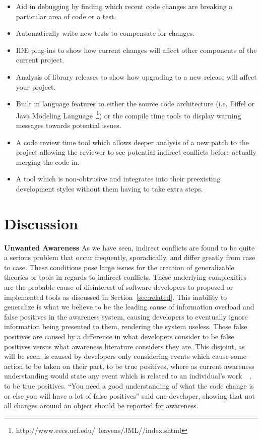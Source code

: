 \documentclass[conference]{IEEEtran}
\begin{document}
\begin{itemize}
	\item Aid in debugging by finding which recent code changes are breaking a particular area of code or a test.
	\item Automatically write new tests to compensate for changes.
	\item IDE plug-ins to show how current changes will affect other components of the current project.
	\item Analysis of library releases to show how upgrading to a new release will affect your project.
	\item Built in language features to either the source code architecture (i.e. Eiffel or 
				Java Modeling Language~\footnote{http://www.eecs.ucf.edu/~leavens/JML//index.shtml}) or the compile 
				time tools to display warning messages towards potential issues.
	\item A code review time tool which allows deeper analysis of a new patch to the project allowing the reviewer to see potential 
				indirect conflicts before actually merging the code in.
	\item A tool which is non-obtrusive and integrates into their preexisting development styles without them having to take extra steps.
\end{itemize}

\section{Discussion}
\label{sec:disc}

\textbf{Unwanted Awareness} As we have seen, indirect conflicts are found to be quite a serious problem that occur frequently,
sporadically, and differ greatly from case to case. These conditions pose large issues for the creation of generalizable theories
or tools in regards to indirect conflicts. These underlying complexities are the probable cause of disinterest of software developers
to proposed or implemented tools as discussed in Section~\ref{sec:related}. This inability to generalize is what we believe to be the
leading cause of information overload and false positives in the awareness system, causing developers to eventually ignore 
information being presented to them, rendering the system useless. These false positives are caused by a difference in what
developers consider to be false positives versus what awareness literature considers they are. This disjoint, as will
be seen, is caused by developers only considering events which cause some action to be taken on their part, to be true positives,
where as current awareness understanding would state any event which is related to an individual's 
work~\cite{Herbsleb06collaborationin}~\cite{Cataldo:2008:SCF}, to be true positives.
``You need a good understanding of what the code change is or else you will have a lot of false positives'' said one developer,
showing that not all changes around an object should be reported for awareness.
\end{document}
